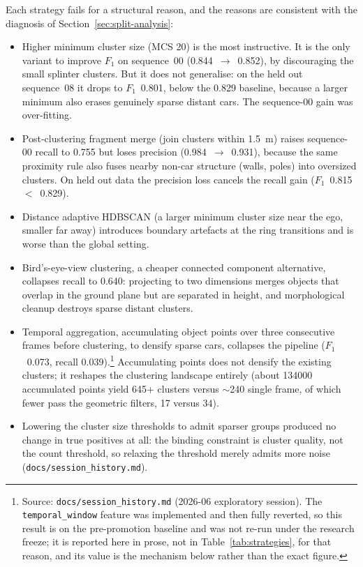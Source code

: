 \documentclass[a4paper,12pt]{report}
\begin{document}
Each strategy fails for a structural reason, and the reasons are consistent with the
diagnosis of Section~\ref{sec:split-analysis}:

\begin{itemize}
  \item Higher minimum cluster size (MCS \num{20}) is the most instructive.
    It is the only variant to improve $F_1$ on sequence~00
    (\num{0.844}~$\rightarrow$~\num{0.852}), by discouraging the small splinter
    clusters. But it does not generalise: on the held out sequence~08 it drops to
    $F_1$~\num{0.801}, below the \num{0.829} baseline, because a larger
    minimum also erases genuinely sparse distant cars. The sequence-00 gain was
    over-fitting.
  \item Post-clustering fragment merge (join clusters within
    \SI{1.5}{\metre}) raises sequence-00 recall to \num{0.755} but loses precision
    (\num{0.984}~$\rightarrow$~\num{0.931}), because the same proximity rule also
    fuses nearby non-car structure (walls, poles) into oversized clusters. On
    held out data the precision loss cancels the recall gain
    ($F_1$~\num{0.815}~$<$~\num{0.829}).
  \item Distance adaptive HDBSCAN (a larger minimum cluster size near the
    ego, smaller far away) introduces boundary artefacts at the ring transitions and
    is worse than the global setting.
  \item Bird's-eye-view clustering, a cheaper
    connected component alternative, collapses recall to \num{0.640}: projecting to
    two dimensions merges objects that overlap in the ground plane but are separated
    in height, and morphological cleanup destroys sparse distant clusters.
  \item Temporal aggregation, accumulating object points over three
    consecutive frames before clustering, to densify sparse cars, collapses the
    pipeline ($F_1$~\num{0.073}, recall \num{0.039}).\footnote{Source:
    \texttt{docs/session\_history.md} (2026-06 exploratory session). The
    \texttt{temporal\_window} feature was implemented and then fully reverted, so
    this result is on the pre-promotion baseline and was not re-run under the
    research freeze; it is reported here in prose, not in Table~\ref{tab:strategies},
    for that reason, and its value is the mechanism below rather than the exact
    figure.} Accumulating points does not densify
    the existing clusters; it reshapes the clustering landscape entirely
    (about \num{134000} accumulated points yield \num{645}+ clusters versus
    $\sim$\num{240} single frame, of which fewer pass the geometric filters,
    \num{17} versus \num{34}).
  \item Lowering the cluster size thresholds to admit sparser groups
    produced no change in true positives at all: the binding constraint is cluster
    quality, not the count threshold, so relaxing the threshold merely admits more
    noise (\texttt{docs/session\_history.md}).
\end{itemize}
\end{document}
